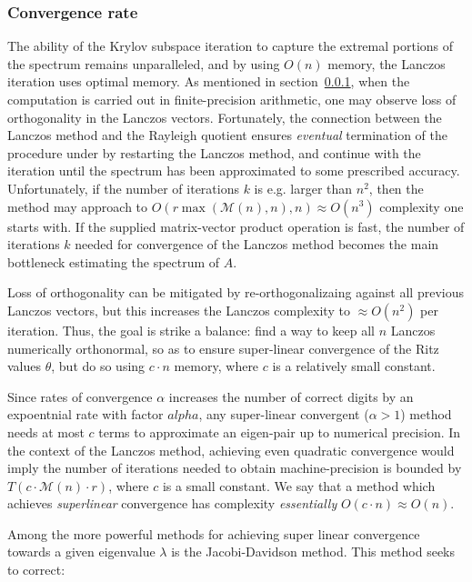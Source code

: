 \documentclass[10pt]{article}
\numberwithin{equation}{section}
\newcommand{\+}{%
	\raisebox{0.18ex}{\scaleobj{0.55}{+}}
}
\theoremstyle{definition}
\begin{document}
\subsubsection{Convergence rate}
The ability of the Krylov subspace iteration to capture the extremal portions of the spectrum remains unparalleled, and by using $O(n)$ memory, the Lanczos iteration uses optimal memory. 
As mentioned in section~\ref{}, when the computation is carried out in finite-precision arithmetic, one may observe loss of orthogonality in the Lanczos vectors. 
Fortunately, the connection between the Lanczos method and the Rayleigh quotient ensures \emph{eventual} termination of the procedure under by restarting the Lanczos method, and continue with the iteration until the spectrum has been approximated to some prescribed accuracy. 
Unfortunately, if the number of iterations $k$ is e.g. larger than $n^2$, then the method may approach to $O(r\max(\mathcal{M}(n), n), n) \approx O(n^3)$ complexity one starts with. 
If the supplied matrix-vector product operation is fast, the number of iterations $k$ needed for convergence of the Lanczos method becomes the main bottleneck estimating the spectrum of $A$.

Loss of orthogonality can be mitigated by re-orthogonalizaing against all previous Lanczos vectors, but this increases the Lanczos complexity to $\approx O(n^2)$ per iteration. 
Thus, the goal is strike a balance: find a way to keep all $n$ Lanczos numerically orthonormal, so as to ensure super-linear convergence of the Ritz values $\theta$, but do so using $c \cdot n$ memory, where $c$ is a relatively small constant.

Since rates of convergence $\alpha$ increases the number of correct digits by an expoentnial rate with factor $alpha$, any super-linear convergent ($\alpha > 1$) method needs at most $c$ terms to approximate an eigen-pair up to numerical precision. 
In the context of the Lanczos method, achieving even quadratic convergence would imply the number of iterations needed to obtain machine-precision is bounded by $T(c \cdot \mathcal{M}(n) \cdot r)$, where $c$ is a small constant. We say that a method which achieves \emph{superlinear} convergence has complexity \emph{essentially} $O(c\cdot n) \approx O(n)$.


Among the more powerful methods for achieving super linear convergence towards a given eigenvalue $\lambda$ is the Jacobi-Davidson method. This method seeks to correct:
\end{document}
